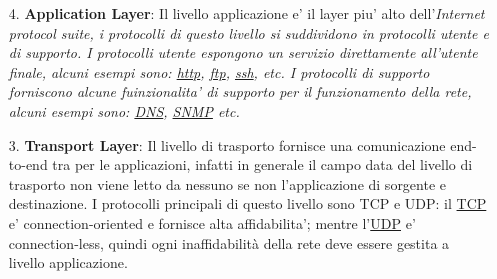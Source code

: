 \begin{enumerate} %
    \item[4.] \textbf{Application Layer}: Il livello applicazione e' il layer piu' alto dell'\it{Internet protocol suite}, i protocolli di questo livello si suddividono in protocolli utente e di supporto. \newline
    I protocolli utente espongono un servizio direttamente all'utente finale, alcuni esempi sono: \href{https://en.wikipedia.org/wiki/Hypertext_Transfer_Protocol}{http}, \href{https://en.wikipedia.org/wiki/File_Transfer_Protocol}{ftp}, \href{https://en.wikipedia.org/wiki/Secure_Shell}{ssh}, etc. \newline
    I protocolli di supporto forniscono alcune fuinzionalita' di supporto per il funzionamento della rete, alcuni esempi sono: \href{https://en.wikipedia.org/wiki/Domain_Name_System}{DNS}, \href{https://en.wikipedia.org/wiki/Simple_Network_Management_Protocol}{SNMP} etc.



    \item[3.] \textbf{Transport Layer}: Il livello di trasporto fornisce una comunicazione end-to-end tra per le applicazioni, infatti in generale il campo data del livello di trasporto non viene letto da nessuno se non l'applicazione di sorgente e destinazione. \newline
    I protocolli principali di questo livello sono TCP e UDP: il \href{https://en.wikipedia.org/wiki/Transmission_Control_Protocol}{TCP} e' connection-oriented e fornisce alta affidabilita'; mentre l'\href{https://en.wikipedia.org/wiki/User_Datagram_Protocol}{UDP} e' connection-less, quindi ogni inaffidabilità della rete deve essere gestita a livello applicazione.
    

\end{enumerate}
